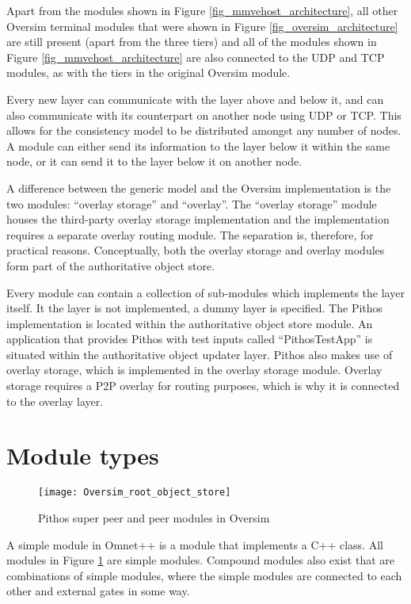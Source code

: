 Apart from the modules shown in Figure \ref{fig_mmvehost_architecture}, all other Oversim terminal modules that were shown in Figure \ref{fig_oversim_architecture} are still present (apart from the three tiers) and all of the modules shown in Figure \ref{fig_mmvehost_architecture} are also connected to the UDP and TCP modules, as with the tiers in the original Oversim module.

Every new layer can communicate with the layer above and below it, and can also communicate with its counterpart on another node using UDP or TCP. This allows for the consistency model to be distributed amongst any number of nodes. A module can either send its information to the layer below it within the same node, or it can send it to the layer below it on another node.

A difference between the generic model and the Oversim implementation is the two modules: ``overlay storage'' and ``overlay''. The ``overlay storage'' module houses the third-party overlay storage implementation and the implementation requires a separate overlay routing module. The separation is, therefore, for practical reasons. Conceptually, both the overlay storage and overlay modules form part of the authoritative object store.

Every module can contain a collection of sub-modules which implements the layer itself. It the layer is not implemented, a dummy layer is specified. The Pithos implementation is located within the authoritative object store module. An application that provides Pithos with test inputs called ``PithosTestApp'' is situated within the authoritative object updater layer. Pithos also makes use of overlay storage, which is implemented in the overlay storage module. Overlay storage requires a P2P overlay for routing purposes, which is why it is connected to the overlay layer.

\section{Module types}
\label{pithos_module_types}

\begin{figure}[htbp]
 \centering
 \texttt{[image: Oversim\_root\_object\_store]}
 \caption{Pithos super peer and peer modules in Oversim}
 \label{fig_oversim_root_object_store}
\end{figure}
%
A simple module in Omnet++ is a module that implements a C++ class. All modules in Figure \ref{fig_oversim_root_object_store} are simple modules. Compound modules also exist that are combinations of simple modules, where the simple modules are connected to each other and external gates in some way.

